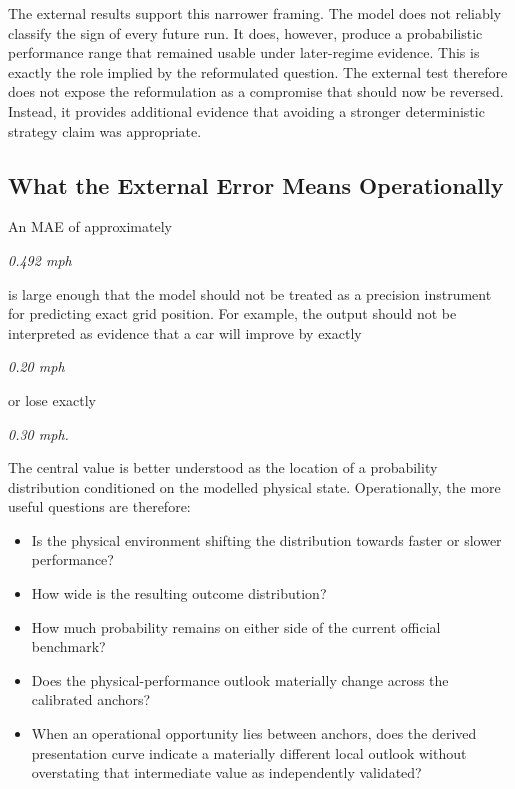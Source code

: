 The external results support this narrower framing. The model does not reliably classify the sign of every future run. It does, however, produce a probabilistic performance range that remained usable under later-regime evidence. This is exactly the role implied by the reformulated question. The external test therefore does not expose the reformulation as a compromise that should now be reversed. Instead, it provides additional evidence that avoiding a stronger deterministic strategy claim was appropriate.

\subsection{What the External Error Means Operationally}
An MAE of approximately

\begin{center}\textit{0.492 mph}\end{center}

is large enough that the model should not be treated as a precision instrument for predicting exact grid position. For example, the output should not be interpreted as evidence that a car will improve by exactly

\begin{center}\textit{0.20 mph}\end{center}

or lose exactly

\begin{center}\textit{0.30 mph.}\end{center}

The central value is better understood as the location of a probability distribution conditioned on the modelled physical state. Operationally, the more useful questions are therefore:

\begin{itemize}
\item Is the physical environment shifting the distribution towards faster or slower performance?
\item How wide is the resulting outcome distribution?
\item How much probability remains on either side of the current official benchmark?
\item Does the physical-performance outlook materially change across the calibrated anchors?
\item When an operational opportunity lies between anchors, does the derived presentation curve indicate a materially different local outlook without overstating that intermediate value as independently validated?
\end{itemize}

